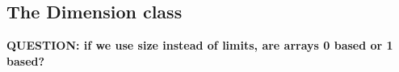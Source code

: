 



\subsection{The Dimension class}


{\bf QUESTION: if we use size instead of limits, are arrays 0 based or 1 based?}

